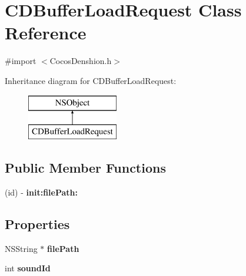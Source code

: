 \hypertarget{interface_c_d_buffer_load_request}{\section{C\-D\-Buffer\-Load\-Request Class Reference}
\label{interface_c_d_buffer_load_request}
}


{\ttfamily \#import $<$Cocos\-Denshion.\-h$>$}

Inheritance diagram for C\-D\-Buffer\-Load\-Request\-:\begin{figure}[H]
\begin{center}
\leavevmode
\includegraphics[height=2.000000cm]{interface_c_d_buffer_load_request}
\end{center}
\end{figure}
\subsection*{Public Member Functions}
\begin{DoxyCompactItemize}
\item 
\hypertarget{interface_c_d_buffer_load_request_a3762af212263c10472874626733812b8}{(id) -\/ {\bfseries init\-:file\-Path\-:}}\label{interface_c_d_buffer_load_request_a3762af212263c10472874626733812b8}

\end{DoxyCompactItemize}
\subsection*{Properties}
\begin{DoxyCompactItemize}
\item 
\hypertarget{interface_c_d_buffer_load_request_ab90e9336fb63689b75041483bfed6fca}{N\-S\-String $\ast$ {\bfseries file\-Path}}\label{interface_c_d_buffer_load_request_ab90e9336fb63689b75041483bfed6fca}

\item 
\hypertarget{interface_c_d_buffer_load_request_ac62e4c90f466471a1b378dd7034e5d7d}{int {\bfseries sound\-Id}}\label{interface_c_d_buffer_load_request_ac62e4c90f466471a1b378dd7034e5d7d}

\end{DoxyCompactItemize}


